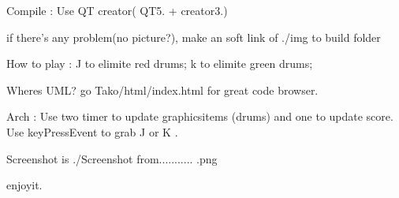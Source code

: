 Compile \+: Use QT creator( Q\+T5. + creator3.) \begin{DoxyVerb}if there's any problem(no picture?), make an soft link of ./img to build folder
\end{DoxyVerb}


How to play \+: J to elimite red drums; k to elimite green drums;

Where\textquotesingle{}s U\+ML? go Tako/html/index.\+html for great code browser.

Arch \+: Use two timer to update graphicsitems (drums) and one to update score. Use key\+Press\+Event to grab J or K .

Screenshot is ./\+Screenshot from........... .png

enjoyit. 